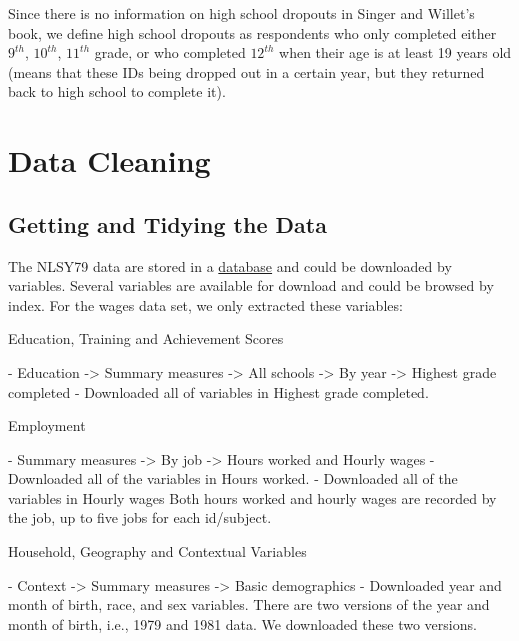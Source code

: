 \documentclass{article}
\begin{document}
Since there is no information on high school dropouts in Singer and Willet's book, we define high school dropouts as respondents who only completed either \(9^{th}\), \(10^{th}\), \(11^{th}\) grade, or who completed \(12^{th}\) when their age is at least 19 years old (means that these IDs being dropped out in a certain year, but they returned back to high school to complete it).

\hypertarget{cleaning}{%
\section{Data Cleaning}\label{cleaning}}

\hypertarget{getting-and-tidying-the-data}{%
\subsection{Getting and Tidying the Data}\label{getting-and-tidying-the-data}}

The NLSY79 data are stored in a \href{https://www.nlsinfo.org/content/cohorts/nlsy79/get-data}{database} and could be downloaded by variables. Several variables are available for download and could be browsed by index. For the wages data set, we only extracted these variables:

\begin{tcolorbox}[width=\textwidth,
                  boxsep=5pt,
                  left=5pt,
                  right=5pt,
                  top=5pt,
                  ]
Education, Training and Achievement Scores

- Education -> Summary measures -> All schools -> By year -> Highest grade completed
  - Downloaded all of variables in Highest grade completed.
  
Employment

- Summary measures -> By job -> Hours worked and Hourly wages
  - Downloaded all of the variables in Hours worked.
  - Downloaded all of the variables in Hourly wages
  Both hours worked and hourly wages are recorded by the job, up to five jobs for each id/subject. 
  
Household, Geography and Contextual Variables

- Context -> Summary measures -> Basic demographics 
  - Downloaded year and month of birth, race, and sex variables.
  There are two versions of the year and month of birth, i.e., 1979 and 1981 data. We downloaded these two versions.

\end{tcolorbox}
\end{document}
